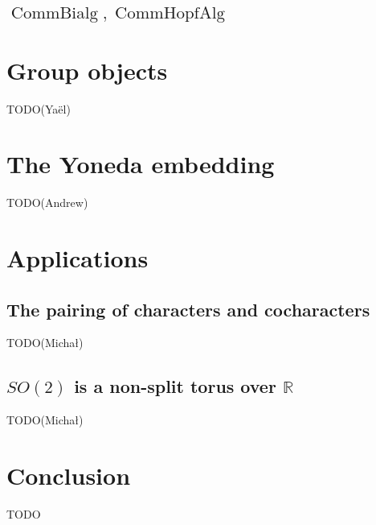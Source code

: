 \documentclass{article}
\newcommand{\R}{\mathbb R}
\DeclareMathOperator{\CommBialg}{CommBialg}
\DeclareMathOperator{\CommHopfAlg}{CommHopfAlg}
\begin{document}
\subsection{\texorpdfstring{$\CommBialg, \CommHopfAlg$}{CommBialg, CommHopfAlg}}\label{sec:comm-hopf-alg}




\section{Group objects}\label{sec:grp}


TODO(Yaël)


\section{The Yoneda embedding}\label{sec:yoneda}


TODO(Andrew)


\section{Applications}


\subsection{The pairing of characters and cocharacters}\label{subsec:char-cochar}


TODO(Michał)


\subsection{\texorpdfstring{$SO(2)$}{SO2} is a non-split torus over \texorpdfstring{$\R$}{R}}\label{subsec:so2}


TODO(Michał)


\section{Conclusion}\label{sec:conclusion}


TODO




\end{document}
